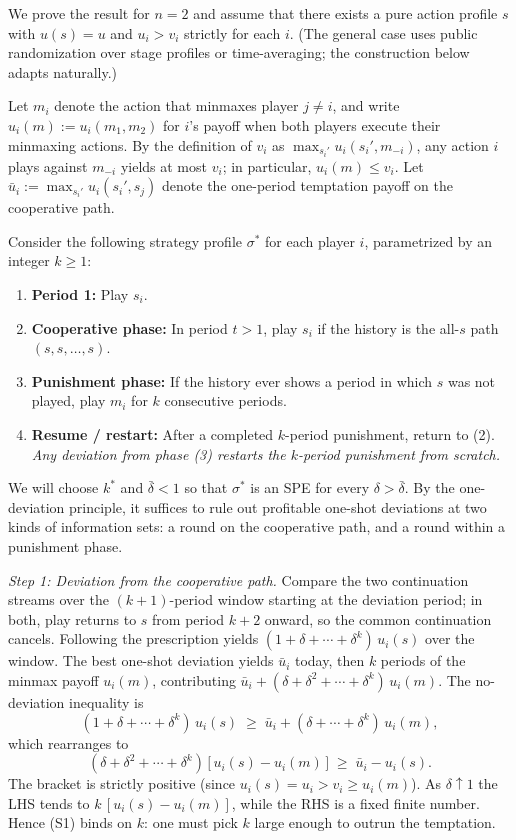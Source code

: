 \begin{thmpf}
  We prove the result for $n = 2$ and assume that there exists a pure action profile $s$ with $u(s) = u$ and $u_i > v_i$ strictly for each $i$. (The general case uses public randomization over stage profiles or time-averaging; the construction below adapts naturally.)

  Let $m_i$ denote the action that minmaxes player $j \neq i$, and write $u_i(m) := u_i(m_1, m_2)$ for $i$'s payoff when both players execute their minmaxing actions. By the definition of $v_i$ as $\max_{s_i'} u_i(s_i', m_{-i})$, any action $i$ plays against $m_{-i}$ yields at most $v_i$; in particular, $u_i(m) \le v_i$. Let $\bar u_i := \max_{s_i'} u_i(s_i', s_j)$ denote the one-period temptation payoff on the cooperative path.

  Consider the following strategy profile $\sigma^*$ for each player $i$, parametrized by an integer $k \ge 1$:
  \begin{enumerate}
    \item \textbf{Period 1:} Play $s_i$.
    \item \textbf{Cooperative phase:} In period $t > 1$, play $s_i$ if the history is the all-$s$ path $(s, s, \ldots, s)$.
    \item \textbf{Punishment phase:} If the history ever shows a period in which $s$ was not played, play $m_i$ for $k$ consecutive periods.
    \item \textbf{Resume / restart:} After a completed $k$-period punishment, return to (2). \emph{Any deviation from phase (3) restarts the $k$-period punishment from scratch.}
  \end{enumerate}

  We will choose $k^*$ and $\bar\delta < 1$ so that $\sigma^*$ is an SPE for every $\delta > \bar\delta$. By the one-deviation principle, it suffices to rule out profitable one-shot deviations at two kinds of information sets: a round on the cooperative path, and a round within a punishment phase.

  \smallskip
  \emph{Step 1: Deviation from the cooperative path.} Compare the two continuation streams over the $(k+1)$-period window starting at the deviation period; in both, play returns to $s$ from period $k+2$ onward, so the common continuation cancels. Following the prescription yields $(1+\delta+\cdots+\delta^k)\,u_i(s)$ over the window. The best one-shot deviation yields $\bar u_i$ today, then $k$ periods of the minmax payoff $u_i(m)$, contributing $\bar u_i + (\delta+\delta^2+\cdots+\delta^k)\,u_i(m)$. The no-deviation inequality is
  \[
    (1+\delta+\cdots+\delta^k)\,u_i(s) \;\ge\; \bar u_i + (\delta+\cdots+\delta^k)\,u_i(m),
  \]
  which rearranges to
  \[
    (\delta+\delta^2+\cdots+\delta^k)\,\bigl[\,u_i(s) - u_i(m)\,\bigr] \;\ge\; \bar u_i - u_i(s). \tag{S1}
  \]
  The bracket is strictly positive (since $u_i(s) = u_i > v_i \ge u_i(m)$). As $\delta \uparrow 1$ the LHS tends to $k\,[u_i(s) - u_i(m)]$, while the RHS is a fixed finite number. Hence (S1) binds on $k$: one must pick $k$ large enough to outrun the temptation.


\end{thmpf}
